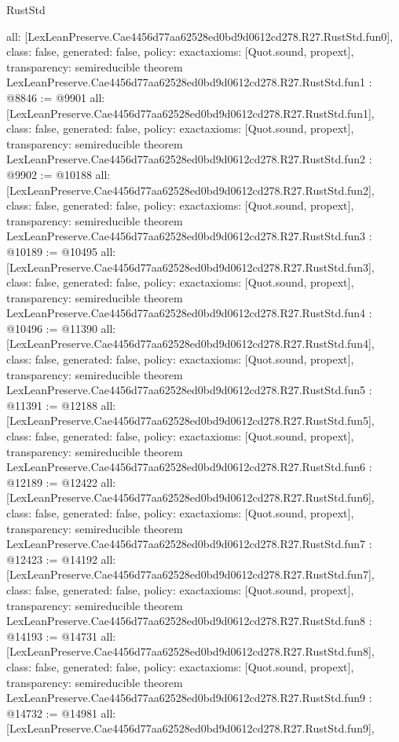 \begin{lexlean}{RustStd}
\begin{coremodule}
{  all: [LexLeanPreserve.Cae4456d77aa62528ed0bd9d0612cd278.R27.RustStd.fun0],
  class: false,
  generated: false,
  policy: exact{axioms: [Quot.sound, propext]},
  transparency: semireducible
}
theorem LexLeanPreserve.Cae4456d77aa62528ed0bd9d0612cd278.R27.RustStd.fun1 : @8846 := @9901 {
  all: [LexLeanPreserve.Cae4456d77aa62528ed0bd9d0612cd278.R27.RustStd.fun1],
  class: false,
  generated: false,
  policy: exact{axioms: [Quot.sound, propext]},
  transparency: semireducible
}
theorem LexLeanPreserve.Cae4456d77aa62528ed0bd9d0612cd278.R27.RustStd.fun2 : @9902 := @10188 {
  all: [LexLeanPreserve.Cae4456d77aa62528ed0bd9d0612cd278.R27.RustStd.fun2],
  class: false,
  generated: false,
  policy: exact{axioms: [Quot.sound, propext]},
  transparency: semireducible
}
theorem LexLeanPreserve.Cae4456d77aa62528ed0bd9d0612cd278.R27.RustStd.fun3 : @10189 := @10495 {
  all: [LexLeanPreserve.Cae4456d77aa62528ed0bd9d0612cd278.R27.RustStd.fun3],
  class: false,
  generated: false,
  policy: exact{axioms: [Quot.sound, propext]},
  transparency: semireducible
}
theorem LexLeanPreserve.Cae4456d77aa62528ed0bd9d0612cd278.R27.RustStd.fun4 : @10496 := @11390 {
  all: [LexLeanPreserve.Cae4456d77aa62528ed0bd9d0612cd278.R27.RustStd.fun4],
  class: false,
  generated: false,
  policy: exact{axioms: [Quot.sound, propext]},
  transparency: semireducible
}
theorem LexLeanPreserve.Cae4456d77aa62528ed0bd9d0612cd278.R27.RustStd.fun5 : @11391 := @12188 {
  all: [LexLeanPreserve.Cae4456d77aa62528ed0bd9d0612cd278.R27.RustStd.fun5],
  class: false,
  generated: false,
  policy: exact{axioms: [Quot.sound, propext]},
  transparency: semireducible
}
theorem LexLeanPreserve.Cae4456d77aa62528ed0bd9d0612cd278.R27.RustStd.fun6 : @12189 := @12422 {
  all: [LexLeanPreserve.Cae4456d77aa62528ed0bd9d0612cd278.R27.RustStd.fun6],
  class: false,
  generated: false,
  policy: exact{axioms: [Quot.sound, propext]},
  transparency: semireducible
}
theorem LexLeanPreserve.Cae4456d77aa62528ed0bd9d0612cd278.R27.RustStd.fun7 : @12423 := @14192 {
  all: [LexLeanPreserve.Cae4456d77aa62528ed0bd9d0612cd278.R27.RustStd.fun7],
  class: false,
  generated: false,
  policy: exact{axioms: [Quot.sound, propext]},
  transparency: semireducible
}
theorem LexLeanPreserve.Cae4456d77aa62528ed0bd9d0612cd278.R27.RustStd.fun8 : @14193 := @14731 {
  all: [LexLeanPreserve.Cae4456d77aa62528ed0bd9d0612cd278.R27.RustStd.fun8],
  class: false,
  generated: false,
  policy: exact{axioms: [Quot.sound, propext]},
  transparency: semireducible
}
theorem LexLeanPreserve.Cae4456d77aa62528ed0bd9d0612cd278.R27.RustStd.fun9 : @14732 := @14981 {
  all: [LexLeanPreserve.Cae4456d77aa62528ed0bd9d0612cd278.R27.RustStd.fun9],
}
\end{coremodule}
\end{lexlean}
